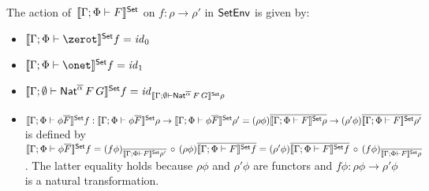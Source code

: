 \documentclass[runningheads]{llncs}
\renewcommand{\id}{\mathit{id}}
\renewcommand{\id}{\mathit{id}}
\begin{document}
\begin{definition}\label{def:set-sem-funcs}
The action
of\, $\llbracket{\Gamma;\Phi \vdash F}\rrbracket^{\mathsf{Set}}$
on
$f : \rho \to \rho'$ in $\mathsf{SetEnv}$ is given by:
\begin{itemize}
\item
 $\setsem{\Gamma;\Phi \vdash \zerot}f = \id_0$
\item
  $\setsem{\Gamma;\Phi \vdash \onet}f = \id_1$
\item %
  $\setsem{\Gamma; \emptyset
    \vdash \Nat^{\ol{\alpha}}\,F\,G} f =
  \id_{\setsem{\Gamma; \emptyset
      \vdash \Nat^{\ol{\alpha}}\,F\,G}\rho}$
\item %
$\llbracket{\Gamma;\Phi \vdash \phi \overline{F}}\rrbracket^{\mathsf{Set}} f : \llbracket{\Gamma;\Phi
  \vdash \phi \overline{F}}\rrbracket^{\mathsf{Set}}\rho \to \llbracket{\Gamma;\Phi \vdash
  \phi\overline{F}}\rrbracket^{\mathsf{Set}}\rho' = (\rho\phi) \overline{\llbracket{\Gamma;\Phi \vdash
    F}\rrbracket^{\mathsf{Set}}\rho} \to (\rho'\phi) \overline{\llbracket{\Gamma;\Phi \vdash
    F}\rrbracket^{\mathsf{Set}}\rho'}$ is defined by $\llbracket{\Gamma;\Phi \vdash \phi
  \overline{F}}\rrbracket^{\mathsf{Set}} f = (f\phi)_{\overline{\llbracket{\Gamma;\Phi \vdash
      F}\rrbracket^{\mathsf{Set}}\rho'}}\, \circ\, (\rho\phi) {\overline{\llbracket{\Gamma;\Phi
      \vdash F}\rrbracket^{\mathsf{Set}} f}} = (\rho'\phi) {\overline{\llbracket{\Gamma;\Phi \vdash
      F}\rrbracket^{\mathsf{Set}} f}}\, \circ\, (f \phi)_{\overline{\llbracket{\Gamma;\Phi \vdash
      F}\rrbracket^{\mathsf{Set}}\rho}}$.  The latter equality holds because $\rho\phi$ and
  $\rho'\phi$ are functors and $f\phi : \rho\phi \to \rho'\phi$ is a
  natural transformation.

\end{itemize}
\end{definition}
\end{document}
